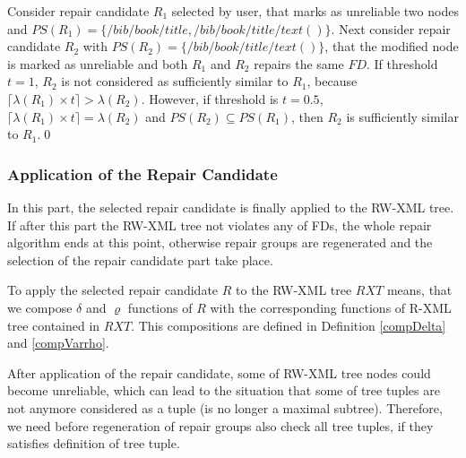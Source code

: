 \begin{example}\label{tresholdExample}
Consider repair candidate $R_1$ selected by user, that marks as unreliable two nodes and $PS(R_1) = \{/bib/book/title, /bib/book/title/text()\}$. Next consider repair candidate $R_2$ with $PS(R_2) = \{/bib/book/title/text()\}$, that the modified node is marked as unreliable and both $R_1$ and $R_2$ repairs the same $FD$. If threshold $t=1$, $R_2$ is not considered as sufficiently similar to $R_1$, because $\lceil\lambda(R_1) \times t\rceil > \lambda(R_2)$. However, if threshold is $t=0.5$, $\lceil\lambda(R_1) \times t\rceil = \lambda(R_2)$ and $PS(R_2) \subseteq PS(R_1)$, then $R_2$ is sufficiently similar to $R_1$.\qed
\end{example}

\subsubsection{Application of the Repair Candidate}

In this part, the selected repair candidate is finally applied to the RW-XML tree. If after this part the RW-XML tree not violates any of FDs, the whole repair algorithm ends at this point, otherwise repair groups are regenerated and the selection of the repair candidate part take place.

To apply the selected repair candidate $R$ to the RW-XML tree $RXT$ means, that we compose $\delta$ and $\varrho$ functions of $R$ with the corresponding functions of R-XML tree contained in $RXT$. This compositions are defined in Definition \ref{compDelta} and \ref{compVarrho}.

After application of the repair candidate, some of RW-XML tree nodes could become unreliable, which can lead to the situation that some of tree tuples are not anymore considered as a tuple (is no longer a maximal subtree). Therefore, we need before regeneration of repair groups also check all tree tuples, if they satisfies definition of tree tuple.
